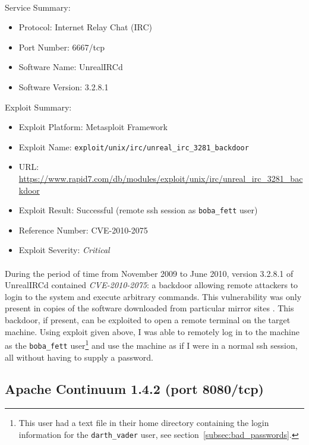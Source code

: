 \documentclass{article}
\begin{document}
\paragraph{}
Service Summary:
\begin{itemize}
	\item Protocol: Internet Relay Chat (IRC)
	\item Port Number: 6667/tcp
	\item Software Name: UnrealIRCd
	\item Software Version: 3.2.8.1
\end{itemize}
Exploit Summary:
\begin{itemize}
	\item Exploit Platform: Metasploit Framework
	\item Exploit Name: \texttt{exploit/unix/irc/unreal\_irc\_3281\_backdoor}
	\item URL: \url{https://www.rapid7.com/db/modules/exploit/unix/irc/unreal\_irc\_3281\_backdoor}
	\item Exploit Result: Successful (remote ssh session as \texttt{boba\_fett} user)
	\item Reference Number: CVE-2010-2075
	\item Exploit Severity: \emph{Critical}
\end{itemize}

\paragraph{}
During the period of time from November 2009 to June 2010, version 3.2.8.1 of UnrealIRCd contained \emph{CVE-2010-2075}: a backdoor allowing remote attackers to login to the system and execute arbitrary commands.
This vulnerability was only present in copies of the software downloaded from particular mirror sites \parencite{mitre20102075}.
This backdoor, if present, can be exploited to open a remote terminal on the target machine.
Using exploit given above, I was able to remotely log in to the machine as the \texttt{boba\_fett} user\footnote{This user had a text file in their home directory containing the login information for the \texttt{darth\_vader} user, see section~\ref{subsec:bad_passwords}.} and use the machine as if I were in a normal ssh session, all without having to supply a password.

\subsection{Apache Continuum 1.4.2 (port 8080/tcp)}
\label{subsec:apache_continuum}
\end{document}

